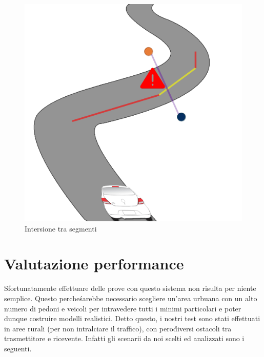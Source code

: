 \documentclass[conference]{IEEEtran}
\begin{document}
\begin{figure}[h!]
	\centering
	\includegraphics[width=0.7\linewidth]{prevmod1}
	\caption{Intersione tra segmenti}
	\label{fig:prevmod1}
\end{figure}

\section{Valutazione performance}
Sfortunatamente effettuare delle prove con questo sistema non risulta per niente semplice. Questo perche\' sarebbe necessario scegliere un'area urbuana con un alto numero di pedoni e veicoli per intravedere tutti i minimi particolari e poter dunque costruire modelli realistici.
Detto questo, i nostri test sono stati effettuati in aree rurali (per non intralciare il traffico), con pero\'  diversi ostacoli tra trasmettitore e ricevente.
Infatti gli scenarii da noi scelti ed analizzati sono i seguenti.
\end{document}

